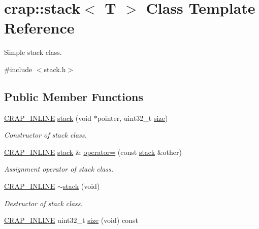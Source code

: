 \hypertarget{classcrap_1_1stack}{}\section{crap\+:\+:stack$<$ T $>$ Class Template Reference}
\label{classcrap_1_1stack}


Simple stack class.  




{\ttfamily \#include $<$stack.\+h$>$}

\subsection*{Public Member Functions}
\begin{DoxyCompactItemize}
\item 
\hyperlink{config__x86_8h_a5a40526b8d842e7ff731509998bb0f1c}{C\+R\+A\+P\+\_\+\+I\+N\+L\+I\+N\+E} \hyperlink{classcrap_1_1stack_a56633f269df5ad10dc5f6ea116542314}{stack} (void $\ast$pointer, uint32\+\_\+t \hyperlink{classcrap_1_1stack_a33a2c5df7c66176cdc22ac80baf297cd}{size})
\begin{DoxyCompactList}\small\item\em Constructor of stack class. \end{DoxyCompactList}\item 
\hyperlink{config__x86_8h_a5a40526b8d842e7ff731509998bb0f1c}{C\+R\+A\+P\+\_\+\+I\+N\+L\+I\+N\+E} \hyperlink{classcrap_1_1stack}{stack} \& \hyperlink{classcrap_1_1stack_a8bdd58bac586291be26985fa7be30e95}{operator=} (const \hyperlink{classcrap_1_1stack}{stack} \&other)
\begin{DoxyCompactList}\small\item\em Assignment operator of stack class. \end{DoxyCompactList}\item 
\hyperlink{config__x86_8h_a5a40526b8d842e7ff731509998bb0f1c}{C\+R\+A\+P\+\_\+\+I\+N\+L\+I\+N\+E} \hyperlink{classcrap_1_1stack_a6af72d9de89e82502613418321cbb233}{$\sim$stack} (void)
\begin{DoxyCompactList}\small\item\em Destructor of stack class. \end{DoxyCompactList}\item 
\hyperlink{config__x86_8h_a5a40526b8d842e7ff731509998bb0f1c}{C\+R\+A\+P\+\_\+\+I\+N\+L\+I\+N\+E} uint32\+\_\+t \hyperlink{classcrap_1_1stack_a33a2c5df7c66176cdc22ac80baf297cd}{size} (void) const 
\item 

\end{DoxyCompactItemize}
